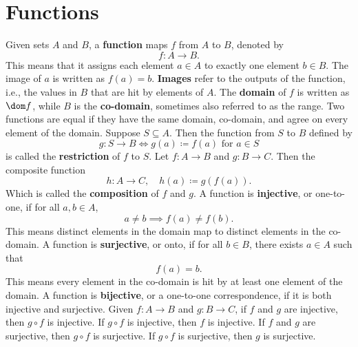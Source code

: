 
\section{Functions}

\begin{definition}
    Given sets $A$ and $B$, a \textbf{function} maps $f$ from $A$ to $B$, denoted by
    \[
        f : A \to B.
    \]
    This means that it assigns each element $a \in A$ to exactly one element $b \in B$.
    The image of $a$ is written as $f(a) = b$.
    \textbf{Images} refer to the outputs of the function, i.e., the values in $B$ that are hit by elements of $A$.
    The \textbf{domain} of $f$ is written as $\dom f$, while $B$ is the \textbf{co-domain}, sometimes also referred to as the range.
    Two functions are equal if they have the same domain, co-domain, and agree on every element of the domain.
    Suppose $S \subseteq A$.
    Then the function from $S$ to $B$ defined by
    \[
        g : S \to B \iff g(a) \coloneqq f(a) \text{ for } a \in S
    \]
    is called the \textbf{restriction} of $f$ to $S$.
    Let $f : A \to B$ and $g : B \to C$.
    Then the composite function
    \[
        h : A \to C, \quad h(a) \coloneqq g(f(a)).
    \]
    Which is called the \textbf{composition} of $f$ and $g$.
    A function is \textbf{injective}, or one-to-one, if for all $a, b \in A$,
    \[
        a \neq b \implies f(a) \neq f(b).
    \]
    This means distinct elements in the domain map to distinct elements in the co-domain.
    A function is \textbf{surjective}, or onto, if for all $b \in B$, there exists $a \in A$ such that
    \[
        f(a) = b.
    \]
    This means every element in the co-domain is hit by at least one element of the domain.
    A function is \textbf{bijective}, or a one-to-one correspondence, if it is both injective and surjective.
    Given $f : A \to B$ and $g : B \to C$, if $f$ and $g$ are injective, then $g \circ f$ is injective.
    If $g \circ f$ is injective, then $f$ is injective.
    If $f$ and $g$ are surjective, then $g \circ f$ is surjective.
    If $g \circ f$ is surjective, then $g$ is surjective.
\end{definition}
